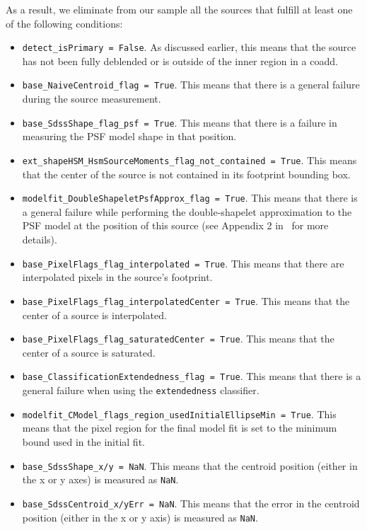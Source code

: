 \documentclass[\docopts]{\docclass}
\begin{document}
As a result, we eliminate from our sample all the sources that fulfill at least one of the following conditions:
\begin{itemize}
\item \texttt{detect\_isPrimary = False}. As discussed earlier, this means that the source has not been fully deblended or is outside of the inner region in a coadd.
\item \texttt{base\_NaiveCentroid\_flag = True}. This means that there is a general failure during the source measurement.
\item \texttt{base\_SdssShape\_flag\_psf = True}. This means that there is a failure in measuring the PSF model shape in that position.
\item \texttt{ext\_shapeHSM\_HsmSourceMoments\_flag\_not\_contained = True}. This means that the center of the source is not contained in its footprint bounding box.
\item \texttt{modelfit\_DoubleShapeletPsfApprox\_flag = True}. This means that there is a general failure while performing the double-shapelet approximation to the PSF model at the position of this source (see Appendix 2 in~\citet{2018PASJ...70S...5B} for more details).
\item \texttt{base\_PixelFlags\_flag\_interpolated = True}. This means that there are interpolated pixels in the source's footprint.
\item \texttt{base\_PixelFlags\_flag\_interpolatedCenter = True}. This means that the center of a source is interpolated.
\item \texttt{base\_PixelFlags\_flag\_saturatedCenter = True}. This means that the center of a source is saturated.
\item \texttt{base\_ClassificationExtendedness\_flag = True}. This means that there is a general failure when using the \texttt{extendedness} classifier.
\item \texttt{modelfit\_CModel\_flags\_region\_usedInitialEllipseMin = True}. This means that the pixel region for the final model fit is set to the minimum bound used in the initial fit.
\item \texttt{base\_SdssShape\_x/y = NaN}. This means that the centroid position (either in the x or y axes) is measured as \texttt{NaN}.
\item \texttt{base\_SdssCentroid\_x/yErr = NaN}. This means that the error in the centroid position (either in the x or y axis) is measured as \texttt{NaN}.
\end{itemize}
\end{document}
